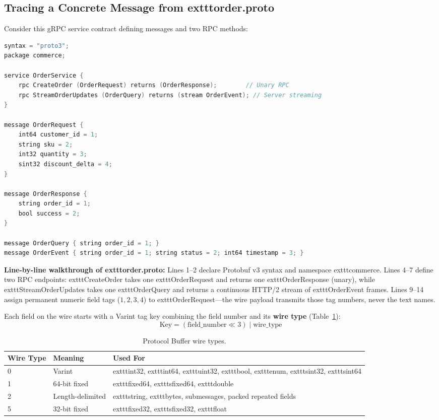 \subsection{Tracing a Concrete Message from 	exttt{order.proto}}

Consider this gRPC service contract defining messages and two RPC methods:

\begin{lstlisting}[language=C,caption={Protobuf IDL Definition (	exttt{order.proto})}]
syntax = "proto3";
package commerce;

service OrderService {
    rpc CreateOrder (OrderRequest) returns (OrderResponse);        // Unary RPC
    rpc StreamOrderUpdates (OrderQuery) returns (stream OrderEvent); // Server streaming
}

message OrderRequest {
    int64 customer_id = 1;
    string sku = 2;
    int32 quantity = 3;
    sint32 discount_delta = 4;
}

message OrderResponse {
    string order_id = 1;
    bool success = 2;
}

message OrderQuery { string order_id = 1; }
message OrderEvent { string order_id = 1; string status = 2; int64 timestamp = 3; }
\end{lstlisting}

\textbf{Line-by-line walkthrough of 	exttt{order.proto}:} Lines 1--2 declare Protobuf v3 syntax and namespace 	exttt{commerce}. Lines 4--7 define two RPC endpoints: 	exttt{CreateOrder} takes one 	exttt{OrderRequest} and returns one 	exttt{OrderResponse} (unary), while 	exttt{StreamOrderUpdates} takes one 	exttt{OrderQuery} and returns a continuous HTTP/2 stream of 	exttt{OrderEvent} frames. Lines 9--14 assign permanent numeric field tags ($1, 2, 3, 4$) to 	exttt{OrderRequest}---the wire payload transmits those tag numbers, never the text names.

Each field on the wire starts with a Varint tag key combining the field number and its \textbf{wire type} (Table~\ref{tab:v1-ch01-protobuf-wire}):
$$\text{Key} = (\text{field\_number} \ll 3) \mid \text{wire\_type}$$

\begin{table}[htbp]
\centering
\small\sffamily
\begin{tabular}{@{}lll@{}}
\toprule
\textbf{Wire Type} & \textbf{Meaning} & \textbf{Used For} \\ \midrule
0 & Varint & 	exttt{int32}, 	exttt{int64}, 	exttt{uint32}, 	exttt{bool}, 	exttt{enum}, 	exttt{sint32}, 	exttt{sint64} \\
1 & 64-bit fixed & 	exttt{fixed64}, 	exttt{sfixed64}, 	exttt{double} \\
2 & Length-delimited & 	exttt{string}, 	exttt{bytes}, submessages, packed repeated fields \\
5 & 32-bit fixed & 	exttt{fixed32}, 	exttt{sfixed32}, 	exttt{float} \\ \bottomrule
\end{tabular}
\caption{Protocol Buffer wire types.}
\label{tab:v1-ch01-protobuf-wire}
\end{table}

